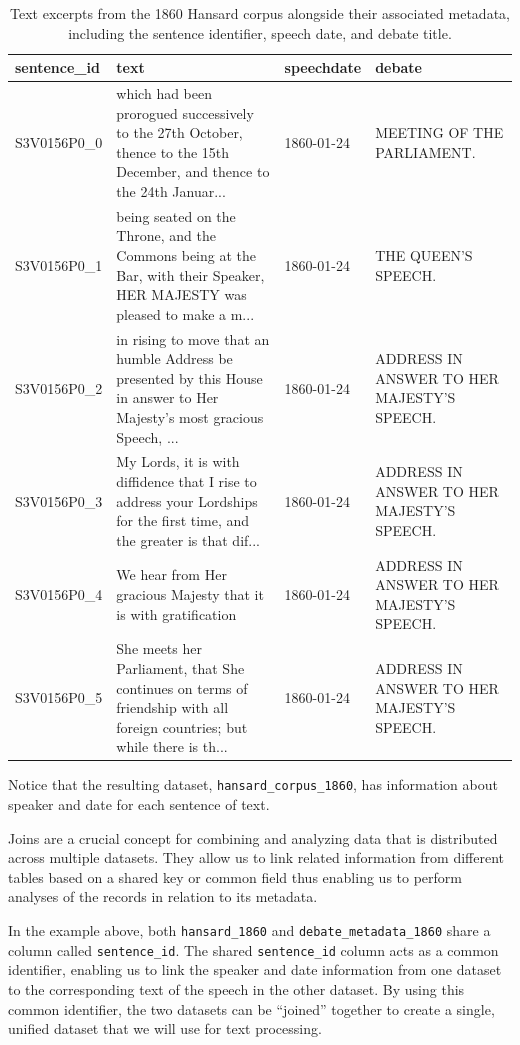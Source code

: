 \documentclass[
]{article}
\begin{document}
\begin{table}

\caption{\label{tab:unnamed-chunk-10}Text excerpts from the 1860 Hansard corpus alongside their associated 
                  metadata, including the sentence identifier, speech date, and 
                  debate title.}
\begin{tabular}[t]{l>{\raggedright\arraybackslash}p{6cm}l>{\raggedright\arraybackslash}p{4cm}}
\toprule
sentence\_id & text & speechdate & debate\\
\midrule
S3V0156P0\_0 & which had been prorogued successively to the 27th October, thence to the 15th December, and thence to the 24th Januar... & 1860-01-24 & MEETING OF THE PARLIAMENT.\\
S3V0156P0\_1 & being seated on the Throne, and the Commons being at the Bar, with their Speaker, HER MAJESTY was pleased to make a m... & 1860-01-24 & THE QUEEN'S SPEECH.\\
S3V0156P0\_2 & in rising to move that an humble Address be presented by this House in answer to Her Majesty's most gracious Speech, ... & 1860-01-24 & ADDRESS IN ANSWER TO HER MAJESTY'S SPEECH.\\
S3V0156P0\_3 & My Lords, it is with diffidence that I rise to address your Lordships for the first time, and the greater is that dif... & 1860-01-24 & ADDRESS IN ANSWER TO HER MAJESTY'S SPEECH.\\
S3V0156P0\_4 & We hear from Her gracious Majesty that it is with gratification & 1860-01-24 & ADDRESS IN ANSWER TO HER MAJESTY'S SPEECH.\\
\addlinespace
S3V0156P0\_5 & She meets her Parliament, that She continues on terms of friendship with all foreign countries; but while there is th... & 1860-01-24 & ADDRESS IN ANSWER TO HER MAJESTY'S SPEECH.\\
\bottomrule
\end{tabular}
\end{table}

Notice that the resulting dataset, \texttt{hansard\_corpus\_1860}, has
information about speaker and date for each sentence of text.

Joins are a crucial concept for combining and analyzing data that is
distributed across multiple datasets. They allow us to link related
information from different tables based on a shared key or common field
thus enabling us to perform analyses of the records in relation to its
metadata.

In the example above, both \texttt{hansard\_1860} and
\texttt{debate\_metadata\_1860} share a column called
\texttt{sentence\_id}. The shared \texttt{sentence\_id} column acts as a
common identifier, enabling us to link the speaker and date information
from one dataset to the corresponding text of the speech in the other
dataset. By using this common identifier, the two datasets can be
``joined'' together to create a single, unified dataset that we will use
for text processing.
\end{document}
